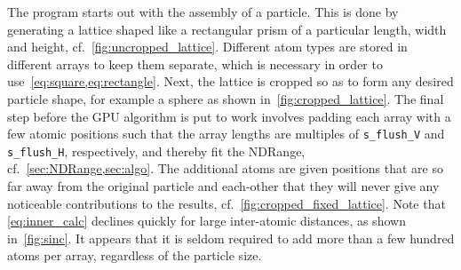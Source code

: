 \documentclass[11pt,twoside]{report}
\begin{document}
\indent The program starts out with the assembly of a particle. This is done by generating a lattice shaped like a rectangular prism of a particular length, width and height, cf.~\cref{fig:uncropped_lattice}. Different atom types are stored in different arrays to keep them separate, which is necessary in order to use~\cref{eq:square,eq:rectangle}. Next, the lattice is cropped so as to form any desired particle shape, for example a sphere as shown in~\cref{fig:cropped_lattice}. The final step before the GPU algorithm is put to work involves padding each array with a few atomic positions such that the array lengths are multiples of {\tt s\_flush\_V} and {\tt s\_flush\_H}, respectively, and thereby fit the NDRange, cf.~\cref{sec:NDRange,sec:algo}. The additional atoms are given positions that are so far away from the original particle and each-other that they will never give any noticeable contributions to the results, cf.~\cref{fig:cropped_fixed_lattice}. Note that \cref{eq:inner_calc} declines quickly for large inter-atomic distances, as shown in~\cref{fig:sinc}. It appears that it is seldom required to add more than a few hundred atoms per array, regardless of the particle size.   
\end{document}

